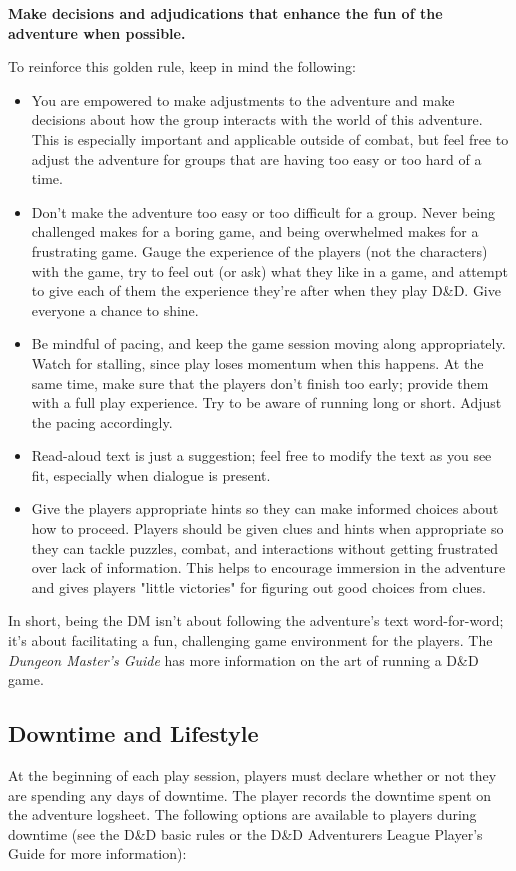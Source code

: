 \documentclass[10pt,a4paper,twoside,bg=print,twocolumn,openany,nodeprecatedcode]{dndbook}
\begin{document}
\textbf{Make decisions and adjudications that enhance the fun of the adventure when possible.}

To reinforce this golden rule, keep in mind the following:


\begin{itemize}
\item You are empowered to make adjustments to the adventure and make decisions about how the group interacts with the world of this adventure. This is especially important and applicable outside of combat, but feel free to adjust the adventure for groups that are having too easy or too hard of a time.
\item Don't make the adventure too easy or too difficult for a group. Never being challenged makes for a boring game, and being overwhelmed makes for a frustrating game. Gauge the experience of the players (not the characters) with the game, try to feel out (or ask) what they like in a game, and attempt to give each of them the experience they're after when they play D\&D. Give everyone a chance to shine.
\item Be mindful of pacing, and keep the game session moving along appropriately. Watch for stalling, since play loses momentum when this happens. At the same time, make sure that the players don't finish too early; provide them with a full play experience. Try to be aware of running long or short. Adjust the pacing accordingly.
\item Read-aloud text is just a suggestion; feel free to modify the text as you see fit, especially when dialogue is present.
\item Give the players appropriate hints so they can make informed choices about how to proceed. Players should be given clues and hints when appropriate so they can tackle puzzles, combat, and interactions without getting frustrated over lack of information. This helps to encourage immersion in the adventure and gives players "little victories" for figuring out good choices from clues.
\end{itemize}

In short, being the DM isn't about following the adventure's text word-for-word; it's about facilitating a fun, challenging game environment for the players. The \textit{Dungeon Master's Guide} has more information on the art of running a D\&D game.

\subsection{Downtime and Lifestyle}
At the beginning of each play session, players must declare whether or not they are spending any days of downtime. The player records the downtime spent on the adventure logsheet. The following options are available to players during downtime (see the D\&D basic rules or the D\&D Adventurers League Player's Guide for more information):
\end{document}
